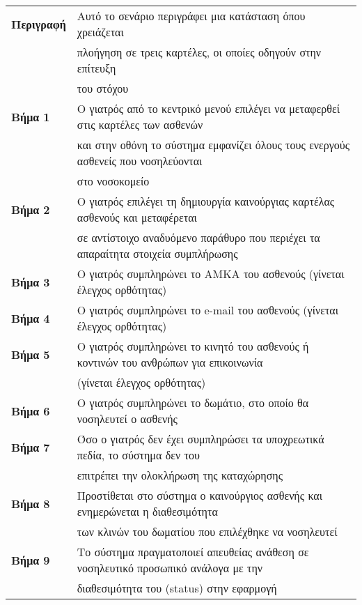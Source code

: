 \documentclass{article}
\newcommand\T{\rule{0pt}{2.6ex}}       %
\newcommand\B{\rule[-1.2ex]{0pt}{0pt}}
\begin{document}
  \begin{center}
     \begin{tabular}{|l|l|}
     \hline
      \textbf{Περιγραφή} & Αυτό το σενάριο περιγράφει μια κατάσταση όπου χρειάζεται \T \\& πλοήγηση σε τρεις καρτέλες, οι οποίες οδηγούν στην επίτευξη \\& του στόχου \B \\ 
      \hline
      \textbf{Βήμα 1} & Ο γιατρός από το κεντρικό μενού επιλέγει να μεταφερθεί στις καρτέλες των ασθενών \T \\& και στην οθόνη το σύστημα εμφανίζει όλους τους ενεργούς ασθενείς  που νοσηλεύονται \\& στο νοσοκομείο \B\\
      \hline
      \textbf{Βήμα 2} & Ο γιατρός επιλέγει τη δημιουργία καινούργιας καρτέλας ασθενούς και μεταφέρεται \T \\& σε αντίστοιχο αναδυόμενο παράθυρο που περιέχει τα απαραίτητα στοιχεία συμπλήρωσης \B \\
      \hline
      \textbf{Βήμα 3} & Ο γιατρός συμπληρώνει το ΑΜΚΑ του ασθενούς (γίνεται έλεγχος ορθότητας) \T\B \\
      \hline
      \textbf{Βήμα 4} & Ο γιατρός συμπληρώνει το e-mail του ασθενούς (γίνεται έλεγχος ορθότητας) \T\B \\
      \hline
      \textbf{Βήμα 5} & Ο γιατρός συμπληρώνει το κινητό του ασθενούς ή κοντινών του ανθρώπων για επικοινωνία \T \\& (γίνεται έλεγχος ορθότητας) \B \\
      \hline
      \textbf{Βήμα 6} & Ο γιατρός συμπληρώνει το δωμάτιο, στο οποίο θα νοσηλευτεί ο ασθενής \T\B \\
      \hline
      \textbf{Βήμα 7} & Όσο ο γιατρός δεν έχει συμπληρώσει τα υποχρεωτικά πεδία, το σύστημα δεν του \T \\&
      επιτρέπει την ολοκλήρωση της καταχώρησης \B \\
      \hline
      \textbf{Βήμα 8} & Προστίθεται στο σύστημα ο καινούργιος ασθενής και ενημερώνεται η διαθεσιμότητα \T \\& των κλινών του δωματίου που επιλέχθηκε να νοσηλευτεί \B \\
      \hline
      \textbf{Βήμα 9} & Το σύστημα πραγματοποιεί απευθείας ανάθεση σε νοσηλευτικό προσωπικό ανάλογα με την \T \\& διαθεσιμότητα του (status) στην εφαρμογή \B \\ 
      \hline
     \end{tabular}
 \end{center}
 
\end{document}
